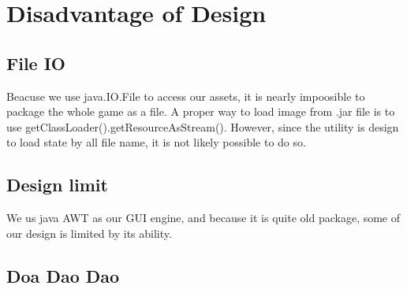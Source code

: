 \section{Disadvantage of Design}
\subsection{File IO}
Beacuse we use java.IO.File to access our assets, it is nearly impoosible to package the whole game as a file.
A proper way to load image from .jar file is to use getClassLoader().getResourceAsStream(). However, since the utility is design to load state by
all file name, it is not likely possible to do so.
\subsection{Design limit}
We us java AWT as our GUI engine, and because it is quite old package, some of our design is limited by its ability.
\subsection{Doa Dao Dao}